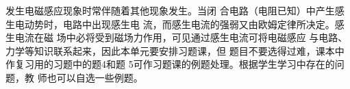 发生电磁感应现象时常伴随着其他现象发生。当闭
合电路（电阻已知）中产生感生电动势时，电路中出现感生电
流，而感生电流的强弱又由欧姆定律所决定。感生电流在磁
场中必将受到磁场力作用，可见通过感生电流可将电磁感应
与电路、力学等知识联系起来，因此本单元要安排习题课，但
题目不要选得过难，课本中作复习用的习题中的题4和题
5可作习题课的例题处理。根据学生学习中存在的问题，教
师也可以自选一些例题。




































